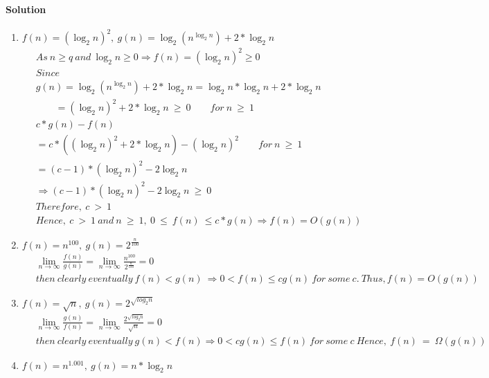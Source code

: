 \documentclass[a4paper]{scrartcl}
\begin{document}
\paragraph{Solution}
\begin{enumerate}[label=(\alph*)]
  \item $f(n)=\left(\log_2n\right)^2,\ g(n)=\log_2\left(n^{\log_2{n}}\right) + 2*\log_2{n}$
  \begin{align*}
  &\ As\ n\geq q\ and\ \log_2{n}\geq 0 \Rightarrow f(n)=(\log_2{n})^2 \geq 0\\ &\
  Since\\ &\
  g(n)= \log_2\left(n^{\log_2{n}}\right) + 2*\log_2{n} = \log_2{n}*\log_2{n} + 2*\log_2{n}\\ &\
  \qquad = \left(\log_2{n}\right)^2 + 2*\log_2{n}\ \geq\ 0\qquad for\ n\ \geq\ 1\\ &\
  c*g(n)-f(n)\\ &\
  =c*(\left(\log_2{n}\right)^2 + 2*\log_2{n})-(\log_2{n})^2 \qquad for\ n\ \geq\ 1 \\ &\
  =(c-1)*(\log_2{n})^2 - 2\log_2{n}\\ &\
  \Rightarrow (c-1)*(\log_2{n})^2 - 2\log_2{n}\ \geq\ 0\\ &\
  Therefore,\ c\ >\ 1\\ &\
  Hence,\ c\ >\ 1\ and\ n\ \geq\ 1,\ 0\ \leq\ f(n)\ \leq c*g(n) \Rightarrow f(n) = O(g(n))
  \end{align*}
  \item $f(n)= n^{100},\ g(n)=2^{\frac{n}{100}}$
  \begin{align*}
   &\ \lim_{n\to\infty} \frac{f(n)}{g(n)}=\lim_{n\to\infty} \frac{n^{100}}{2^{\frac{n}{100}}}=0\\ &\
  then\ clearly\ eventually\ f(n)<g(n)\ \Rightarrow 0<f(n)\leq cg(n)\ for\ some\ c.\ Thus, f(n)=O(g(n))
  \end{align*}
  \item $f(n)=\sqrt{n},\ g(n)=2^{\sqrt{log_2 n}}$
  \begin{align*}
    &\ \lim_{n\to\infty} \frac{g(n)}{f(n)}=\lim_{n\to\infty} \frac{2^{\sqrt{log_2 n}}}{\sqrt{n}}=0\\ &\
    then\ clearly\ eventually\ g(n)<f(n)\Rightarrow 0<cg(n)\leq f(n)\ for\ some\ c\ Hence,\ f(n)\ =\ \Omega(g(n))
  \end{align*}
  \item $f(n)=n^{1.001},\ g(n)=n*\log_2{n}$
  \begin{align*}

\end{align*}
\end{enumerate}
\end{document}
